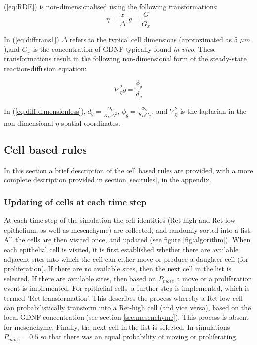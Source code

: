 \documentclass[pdftex,10pt,a4paper,twocolumn]{article}
\begin{document}
(\ref{eq:RDE}) is non-dimensionalised using the following transformations:
\begin{equation}\label{eq:difftrans1}
\eta = \frac{x}{\Delta}, g = \frac{G}{G_x}
\end{equation}


In (\ref{eq:difftrans1}) $\Delta$ refers to the typical cell dimensions (approximated as 5 $\mu m$),and $G_x$ is the concentration of GDNF typically found \textit{in vivo}. These transformations result in the following non-dimensional form of the steady-state reaction-diffusion equation:

\begin{equation}\label{eq:diff-dimensionless}
\nabla_\eta^2 g = \frac{\phi_g}{d_g}
\end{equation}

In (\ref{eq:diff-dimensionless}), $d_g = \frac{D_G}{K_G \Delta^2}$, $\phi_g = \frac{\Phi_G}{K_G G_x}$, and $\nabla_\eta^2$ is the laplacian in the non-dimensional $\eta$ spatial coordinates.

\subsection{Cell based rules}
In this section a brief description of the cell based rules are provided, with a more complete description provided in section \ref{sec:rules}, in the appendix. 

\subsubsection{Updating of cells at each time step}\label{sec:updateall}
At each time step of the simulation the cell identities (Ret-high and Ret-low epithelium, as well as mesenchyme) are collected, and randomly sorted into a list. All the cells are then visited once, and updated (see figure \ref{fig:algorithm}). When each epithelial cell is visited, it is first established whether there are available adjacent sites into which the cell can either move or produce a daughter cell (for proliferation). If there are no available sites, then the next cell in the list is selected. If there are available sites, then based on $P_{move}$ a move or a proliferation event is implemented. For epithelial cells, a further step is implemented, which is termed 'Ret-transformation'. This describes the process whereby a Ret-low cell can probabilistically transform into a Ret-high cell (and vice versa), based on the local GDNF concentration (see section \ref{sec:mesenchyme}). This process is absent for mesenchyme. Finally, the next cell in the list is selected. In simulations $P_{move}=0.5$ so that there was an equal probability of moving or proliferating.
\end{document}
